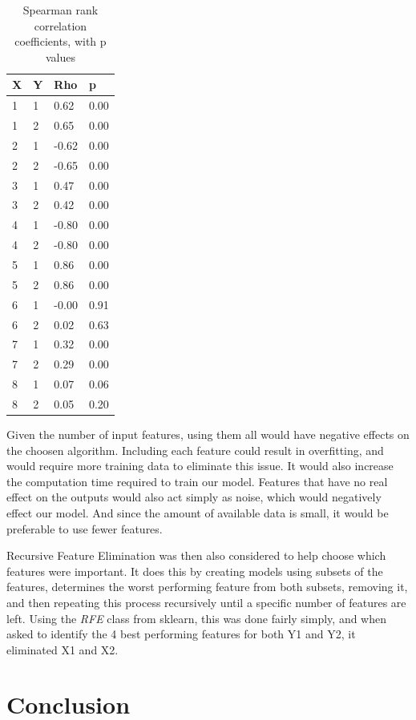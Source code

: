 \documentclass[12pt]{article}
\begin{document}
\begin{table}[!ht]
\centering
\caption{Spearman rank correlation coefficients, with p values}
\label{tbl:spearman-table}
\begin{tabular}{||llll||}
\hline
X    				& Y & Rho   & p    \\
\hline
1                   & 1 & 0.62  & 0.00 \\
1                   & 2 & 0.65  & 0.00 \\
2                   & 1 & -0.62 & 0.00 \\
2                   & 2 & -0.65 & 0.00 \\
3                   & 1 & 0.47  & 0.00 \\
3                   & 2 & 0.42  & 0.00 \\
4                   & 1 & -0.80 & 0.00 \\
4                   & 2 & -0.80 & 0.00 \\
5                   & 1 & 0.86  & 0.00 \\
5                   & 2 & 0.86  & 0.00 \\
6                   & 1 & -0.00 & 0.91 \\
6                   & 2 & 0.02  & 0.63 \\
7                   & 1 & 0.32  & 0.00 \\
7                   & 2 & 0.29  & 0.00 \\
8                   & 1 & 0.07  & 0.06 \\
8                   & 2 & 0.05  & 0.20 \\
\hline
\end{tabular}
\end{table}

Given the number of input features, using them all would have negative effects on the choosen algorithm. Including each feature could result in overfitting, and would require more training data to eliminate this issue. It would also increase the computation time required to train our model. Features that have no real effect on the outputs would also act simply as noise, which would negatively effect our model. And since the amount of available data is small, it would be preferable to use fewer features.

Recursive Feature Elimination was then also considered to help choose which features were important. It does this by creating models using subsets of the features, determines the worst performing feature from both subsets, removing it, and then repeating this process recursively until a specific number of features are left. Using the \emph{RFE} class from sklearn, this was done fairly simply, and when asked to identify the 4 best performing features for both Y1 and Y2, it eliminated X1 and X2. 

\part*{Conclusion}



\end{document}
